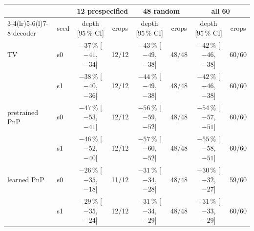 \begin{tabular}{@{}ll cc cc cc@{}}\toprule
 & & \multicolumn{2}{c}{12 prespecified} & \multicolumn{2}{c}{48 random} & \multicolumn{2}{c}{all 60}\\
\cmidrule(lr){3-4}\cmidrule(lr){5-6}\cmidrule(l){7-8}
decoder & seed & depth [95\,\% CI] & crops & depth [95\,\% CI] & crops & depth [95\,\% CI] & crops\\\midrule
TV & s0 & $-37$\,\% [$-41$, $-34$] & 12/12 & $-43$\,\% [$-49$, $-38$] & 48/48 & $-42$\,\% [$-46$, $-38$] & 60/60\\
 & s1 & $-38$\,\% [$-40$, $-36$] & 12/12 & $-44$\,\% [$-49$, $-38$] & 48/48 & $-42$\,\% [$-46$, $-38$] & 60/60\\
pretrained PnP & s0 & $-47$\,\% [$-53$, $-41$] & 12/12 & $-56$\,\% [$-59$, $-52$] & 48/48 & $-54$\,\% [$-57$, $-51$] & 60/60\\
 & s1 & $-46$\,\% [$-52$, $-40$] & 12/12 & $-57$\,\% [$-60$, $-52$] & 48/48 & $-55$\,\% [$-58$, $-51$] & 60/60\\
learned PnP & s0 & $-26$\,\% [$-35$, $-18$] & 11/12 & $-31$\,\% [$-34$, $-28$] & 48/48 & $-30$\,\% [$-32$, $-27$] & 59/60\\
 & s1 & $-29$\,\% [$-35$, $-24$] & 12/12 & $-31$\,\% [$-34$, $-29$] & 48/48 & $-31$\,\% [$-33$, $-29$] & 60/60\\
\bottomrule\end{tabular}
